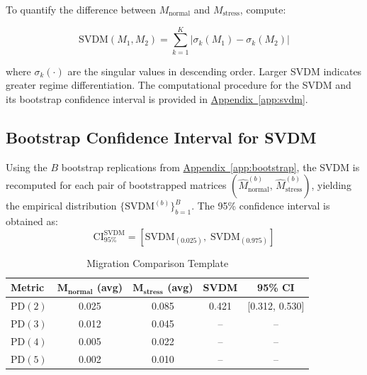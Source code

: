 \documentclass[12pt,a4paper]{article}
\newcommand{\Mnormal}{M_{\text{normal}}}
\newcommand{\Mstress}{M_{\text{stress}}}
\newcommand{\PD}{\text{PD}}
\begin{document}
To quantify the difference between $\Mnormal$ and $\Mstress$, compute:

\begin{equation}
\text{SVDM}(M_1, M_2) = \sum_{k=1}^K |\sigma_k(M_1) - \sigma_k(M_2)|
\end{equation}

where $\sigma_k(\cdot)$ are the singular values in descending order. Larger SVDM indicates greater regime differentiation. The computational procedure for the SVDM and its bootstrap confidence interval is provided in \hyperref[app:svdm]{Appendix~\ref*{app:svdm}}.

\subsection{Bootstrap Confidence Interval for SVDM}

Using the $B$ bootstrap replications from \hyperref[app:bootstrap]{Appendix~\ref*{app:bootstrap}}, the SVDM is recomputed for each pair of bootstrapped matrices $(\hat{M}_{\text{normal}}^{(b)},\, \hat{M}_{\text{stress}}^{(b)})$, yielding the empirical distribution $\{\text{SVDM}^{(b)}\}_{b=1}^{B}$. The 95\% confidence interval is obtained as:
\begin{equation}
\text{CI}_{95\%}^{\text{SVDM}} = \left[\text{SVDM}_{(0.025)},\; \text{SVDM}_{(0.975)}\right]
\end{equation}

\begin{table}[H]
\centering
\caption{Migration Comparison Template}
\label{tab:migration_comparison}
\begin{tabular}{@{}lcccc@{}}
\toprule
\textbf{Metric} & $\mathbf{M}_{\textbf{normal}}$ \textbf{(avg)} & $\mathbf{M}_{\textbf{stress}}$ \textbf{(avg)} & \textbf{SVDM} & \textbf{95\% CI} \\
\midrule
$\PD(2)$ & 0.025 & 0.085 & 0.421 & [0.312, 0.530] \\
$\PD(3)$ & 0.012 & 0.045 & -- & -- \\
$\PD(4)$ & 0.005 & 0.022 & -- & -- \\
$\PD(5)$ & 0.002 & 0.010 & -- & -- \\
\bottomrule
\end{tabular}
\end{table}
\end{document}
